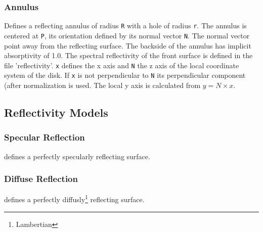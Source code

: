 \documentclass[10pt,a4paper,titlepage]{article}
\begin{document}
\subsubsection{Annulus}










\vspace{0.25cm}
Defines a reflecting annulus of radius {\tt R} with a hole of radius {\tt r}. The annulus is centered at {\tt P}, its orientation defined by its normal vector {\tt N}. The normal vector point away from the reflecting surface. The backside of the annulus has implicit absorptivity of 1.0. The spectral reflectivity of the front surface is defined in the file 'reflectivity'. {\tt x} defines the x axis and {\tt N} the z axis of the local coordinate system of the disk. If {\tt x} is not perpendicular to {\tt N} its perpendicular component (after normalization is used. The local y axis is calculated from $y = N \times x$.

\subsection{Reflectivity Models} \label{sec:refl_models}

\subsubsection{Specular Reflection}

 defines a perfectly specularly reflecting surface.

\subsubsection{Diffuse Reflection}

 defines a perfectly diffusly\footnote{Lambertian} reflecting surface.
\end{document}
